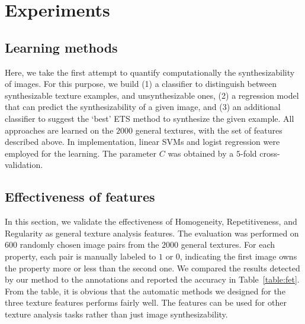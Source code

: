 \section{Experiments}
\label{sec:experiment}

\subsection{Learning methods}

Here, we take the first attempt to quantify computationally the
synthesizability of images. For this purpose, we build (1) a
classifier to distinguish between synthesizable texture examples, and
unsynthesizable ones, (2) a regression model that can predict the
synthesizability of a given image, and (3) an additional classifier to
suggest the `best' ETS method to synthesize the given example.  All
approaches are learned on the $2000$ general textures, with the set of
features described above.  In implementation, linear SVMs and logist
regression were employed for the learning. The parameter $C$ was
obtained by a $5$-fold cross-validation.

\subsection{Effectiveness of features}
In this section, we validate the effectiveness of Homogeneity,
Repetitiveness, and Regularity as general texture analysis
features. The evaluation was performed on $600$ randomly chosen image
pairs from the $2000$ general textures. For each property, each pair
is manually labeled to $1$ or $0$, indicating the first image owns the
property more or less than the second one.  We compared the results
detected by our method to the annotations and reported the accuracy in
Table~\ref{table:fet}. From the table, it is obvious that the
automatic methods we designed for the three texture features performs
fairly well. The features can be used for other texture analysis tasks
rather than just image synthesizability.

